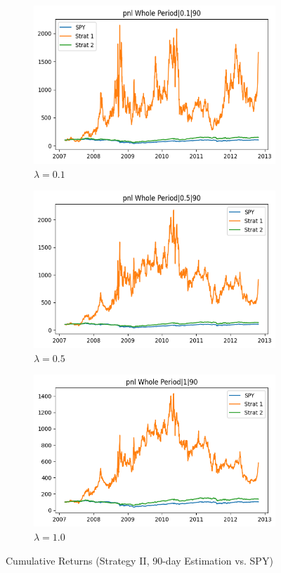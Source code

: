 \documentclass[12pt]{article}
\begin{document}
\begin{figure}[H]
\centering
\begin{subfigure}{0.32\textwidth}
\includegraphics[width=\linewidth]{"plots/pnl_wholeperiod_0.1_90.png"}
\caption{$\lambda=0.1$}
\end{subfigure}
\begin{subfigure}{0.32\textwidth}
\includegraphics[width=\linewidth]{"plots/pnl_wholeperiod_0.5_90.png"}
\caption{$\lambda=0.5$}
\end{subfigure}
\begin{subfigure}{0.32\textwidth}
\includegraphics[width=\linewidth]{"plots/pnl_wholeperiod_1_90.png"}
\caption{$\lambda=1.0$}
\end{subfigure}
\caption{Cumulative Returns (Strategy II, 90-day Estimation vs. SPY)}
\label{fig:pnl_90}
\end{figure}
\end{document}
